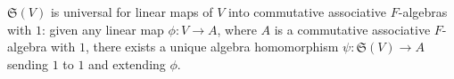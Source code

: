 $\mathfrak{S}(V)$ is universal for linear maps of $V$ into commutative associative $F$-algebras with $1$: given any linear map $\phi: V \to A$, where $A$ is a commutative associative $F$-algebra with $1$, there exists a unique algebra homomorphism $\psi: \mathfrak{S}(V) \to A$ sending $1$ to $1$ and extending $\phi$.
